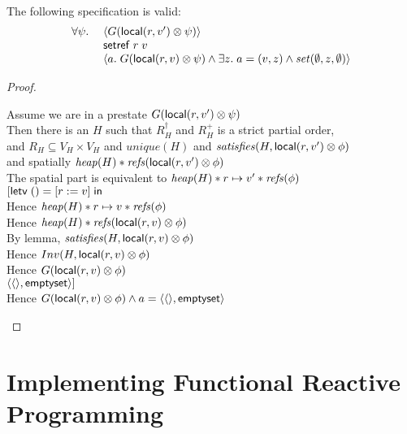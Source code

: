 \ \\

\begin{prop*}
The following specification is valid:
\begin{displaymath}
\begin{array}{ll}
\forall \psi.\; 
  &    \left<G(\mathsf{local}({r}, {v'}) \otimes \psi)\right> \\
  &    \mathsf{setref}\; r\;v \\
  &    \left<a.\; G(\mathsf{local}({r}, {v}) \otimes \psi) 
                  \land  \exists z.\;a = (v,z) \land \mathit{set}(\emptyset, z, \emptyset)
       \right> 
\end{array}
\end{displaymath}
\end{prop*}

\begin{proof}
\begin{tabbedproof}
\oo Assume we are in a prestate $G(\mathsf{local}({r}, {v'}) \otimes \psi)$ \\
\oo Then there is an $H$ such that $R^\dagger_H$ and  $R^+_H$ is a strict partial order, \\
\oo and $R_H \subseteq V_H \times V_H$ and $\mathit{unique}(H)$ and $\mathit{satisfies}({H}, {\mathsf{local}({r}, {v'}) \otimes \phi})$ \\
\oo and spatially $\mathit{heap}(H) * \mathit{refs}(\mathsf{local}({r}, {v'}) \otimes \phi)$\\
\oo The spatial part is equivalent to $\mathit{heap}(H) * r \mapsto v' * \mathit{refs}(\phi)$ \\
\oo $[\mathsf{letv}\;() = [r := v]\;\mathsf{in}\;$ \\
\oo Hence $\mathit{heap}(H) * r \mapsto v * \mathit{refs}(\phi)$ \\
\oo Hence $\mathit{heap}(H) * \mathit{refs}(\mathsf{local}({r}, {v}) \otimes \phi)$ \\
\oo By lemma, $\mathit{satisfies}({H}, {\mathsf{local}({r}, {v}) \otimes \phi})$ \\
\oo Hence $Inv(H, \mathsf{local}({r}, {v}) \otimes \phi)$ \\
\oo Hence $G(\mathsf{local}({r}, {v}) \otimes \phi)$ \\
\oo $\left<{\left<\right>},{\mathsf{emptyset}}\right>]$ \\
\oo Hence $G(\mathsf{local}({r}, {v}) \otimes \phi) \land a = \left<{\left<\right>},{\mathsf{emptyset}}\right>$ \\
\end{tabbedproof}
\end{proof}

\section{Implementing Functional Reactive Programming}


